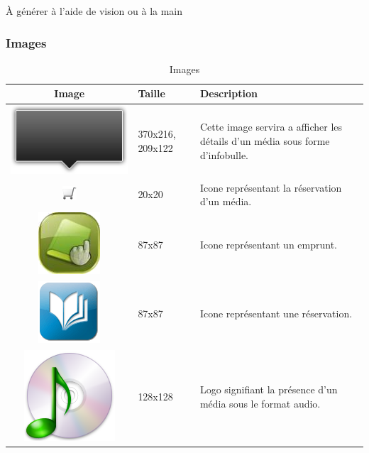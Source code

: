 \documentclass[letter, 11pt]{report}
\begin{document}
À générer à l'aide de vision ou à la main

\subsubsection{Images}

\begin{table}[h!tbp]
	\caption{Images}
	\begin{center}
		\begin{tabular}{|c|l|p{10cm}|}
		\hline
		Image                                            & Taille           & Description \\ \hline
		\includegraphics[scale=0.2]{black_arrow_big.png} & 370x216, 209x122 & Cette image servira a afficher les détails d'un média sous forme d'infobulle.\\ \hline
		\includegraphics{cart.png}                       & 20x20            & Icone représentant la réservation d'un média. \\ \hline
		\includegraphics[scale=1.15]{emprunt.png}        & 87x87            & Icone représentant un emprunt. \\ \hline
		\includegraphics[scale=0.3]{reservation.png}     & 87x87            & Icone représentant une réservation. \\ \hline
		\includegraphics[scale=0.3]{audio.png}           & 128x128          & Logo signifiant la présence d'un média sous le format audio. \\ \hline

\end{tabular}
\end{center}
\end{table}
\end{document}
